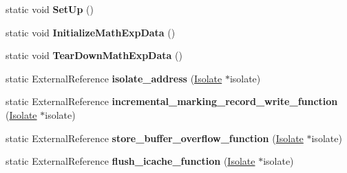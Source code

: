 \begin{DoxyCompactItemize}
\item 
\hypertarget{classv8_1_1internal_1_1_b_a_s_e___e_m_b_e_d_d_e_d_a7b09d8b359025676828c7d987b70bccc}{}static void {\bfseries Set\+Up} ()\label{classv8_1_1internal_1_1_b_a_s_e___e_m_b_e_d_d_e_d_a7b09d8b359025676828c7d987b70bccc}

\item 
\hypertarget{classv8_1_1internal_1_1_b_a_s_e___e_m_b_e_d_d_e_d_a5f80569b68747bcd742399ced7f8e102}{}static void {\bfseries Initialize\+Math\+Exp\+Data} ()\label{classv8_1_1internal_1_1_b_a_s_e___e_m_b_e_d_d_e_d_a5f80569b68747bcd742399ced7f8e102}

\item 
\hypertarget{classv8_1_1internal_1_1_b_a_s_e___e_m_b_e_d_d_e_d_a6b47efdadd166b058753497bcba2777e}{}static void {\bfseries Tear\+Down\+Math\+Exp\+Data} ()\label{classv8_1_1internal_1_1_b_a_s_e___e_m_b_e_d_d_e_d_a6b47efdadd166b058753497bcba2777e}

\item 
\hypertarget{classv8_1_1internal_1_1_b_a_s_e___e_m_b_e_d_d_e_d_ac1301b96ad1fd920794cbee9aacdc902}{}static External\+Reference {\bfseries isolate\+\_\+address} (\hyperlink{classv8_1_1internal_1_1_isolate}{Isolate} $\ast$isolate)\label{classv8_1_1internal_1_1_b_a_s_e___e_m_b_e_d_d_e_d_ac1301b96ad1fd920794cbee9aacdc902}

\item 
\hypertarget{classv8_1_1internal_1_1_b_a_s_e___e_m_b_e_d_d_e_d_ad20357e6426ed3f6813225cc99117e29}{}static External\+Reference {\bfseries incremental\+\_\+marking\+\_\+record\+\_\+write\+\_\+function} (\hyperlink{classv8_1_1internal_1_1_isolate}{Isolate} $\ast$isolate)\label{classv8_1_1internal_1_1_b_a_s_e___e_m_b_e_d_d_e_d_ad20357e6426ed3f6813225cc99117e29}

\item 
\hypertarget{classv8_1_1internal_1_1_b_a_s_e___e_m_b_e_d_d_e_d_adea5781f7465e45fc015bac0b51f3576}{}static External\+Reference {\bfseries store\+\_\+buffer\+\_\+overflow\+\_\+function} (\hyperlink{classv8_1_1internal_1_1_isolate}{Isolate} $\ast$isolate)\label{classv8_1_1internal_1_1_b_a_s_e___e_m_b_e_d_d_e_d_adea5781f7465e45fc015bac0b51f3576}

\item 
\hypertarget{classv8_1_1internal_1_1_b_a_s_e___e_m_b_e_d_d_e_d_a4b8161420f55e9b2c36815d6358fde91}{}static External\+Reference {\bfseries flush\+\_\+icache\+\_\+function} (\hyperlink{classv8_1_1internal_1_1_isolate}{Isolate} $\ast$isolate)\label{classv8_1_1internal_1_1_b_a_s_e___e_m_b_e_d_d_e_d_a4b8161420f55e9b2c36815d6358fde91}


\end{DoxyCompactItemize}
